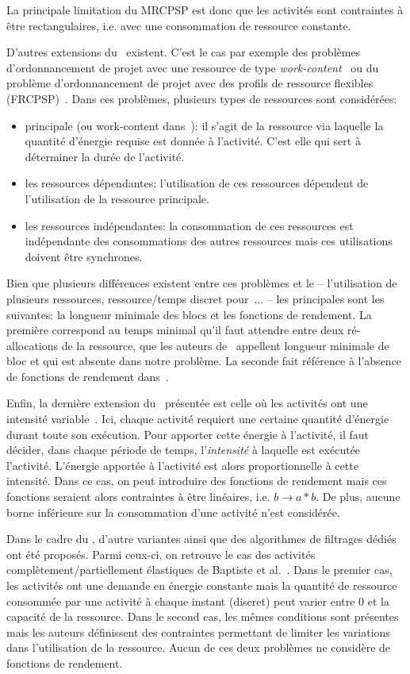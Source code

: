 La principale limitation du MRCPSP est donc que les activités sont
contraintes à être rectangulaires, i.e. avec une consommation de ressource
constante. 

D'autres extensions du \RCPSP~existent. C'est le cas par exemple des
problèmes d'ordonnancement de projet avec une ressource de type {\it
  work-content}~\cite{FT} ou du problème d'ordonnancement de projet
avec des profils de ressource flexibles (FRCPSP)~\cite{NK}. Dans ces
problèmes, plusieurs types de ressources sont considérées: 
\begin{itemize}
\item principale (ou work-content dans~\cite{FT}): il s'agit de la
  ressource via laquelle la quantité d'énergie requise est donnée à
  l'activité. C'est elle qui sert à déterminer la durée de l'activité.
\item les ressources dépendantes: l'utilisation de ces ressources
  dépendent de l'utilisation de la ressource principale.
\item les ressources indépendantes: la consommation de ces ressources
  est indépendante des consommations des autres ressources mais ces
  utilisations doivent être synchrones. 
\end{itemize}

Bien que plusieurs différences existent entre ces problèmes et le
\CECSP -- l'utilisation de plusieurs ressources, ressource/temps discret
pour~\cite{FT}... -- les principales sont les suivantes: la longueur
minimale des blocs et les fonctions de rendement. La première
correspond au temps minimal qu'il faut attendre entre deux
ré-allocations de la ressource, que les auteurs de~\cite{FT} appellent
longueur minimale de bloc et qui est absente dans notre problème. La
seconde fait référence à l'absence de fonctions de rendement
dans~\cite{FT}. 

Enfin, la dernière extension du \RCPSP~présentée est celle où les
activités ont une intensité variable~\cite{Kis}. Ici, chaque activité
requiert une certaine quantité d'énergie durant toute son
exécution. Pour apporter cette énergie à l'activité, il faut décider,
dans chaque période de temps, l'{\it intensité} à laquelle est
exécutée l'activité. L'énergie apportée à l'activité est alors
proportionnelle à cette intensité. Dans ce cas, on peut introduire des
fonctions de rendement mais ces fonctions seraient alors contraintes à
être linéaires, i.e. $b \rightarrow a*b$. De plus, aucune borne
inférieure sur la consommation d'une activité n'est considérée.

Dans le cadre du \CUSP, d'autre variantes ainsi que des algorithmes de
filtrages dédiés ont été proposés. Parmi ceux-ci, on retrouve le cas
des activités complètement/partiellement élastiques de Baptiste et
al.~\cite{BLN}. Dans le premier cas, les activités ont une demande en
énergie constante mais la quantité de ressource consommée par
une activité à chaque instant (discret) peut varier entre $0$ et la
capacité de la ressource. Dans le second cas, les mêmes conditions
sont présentes mais les auteurs définissent des contraintes permettant
de limiter les variations dans l'utilisation de la ressource. Aucun de
ces deux problèmes ne considère de fonctions de rendement. 

